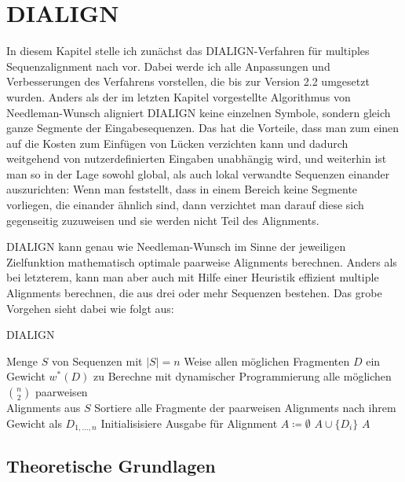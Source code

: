\chapter{DIALIGN}
\label{ch:DIALIGN}
In diesem Kapitel stelle ich zunächst das DIALIGN-Verfahren für multiples Sequenzalignment nach \cite{mdw96} vor. Dabei werde ich alle Anpassungen und Verbesserungen des Verfahrens vorstellen, die bis zur Version 2.2 umgesetzt wurden. Anders als der im letzten Kapitel vorgestellte Algorithmus von Needleman-Wunsch aligniert DIALIGN keine einzelnen Symbole, sondern gleich ganze Segmente der Eingabesequenzen. Das hat die Vorteile, dass man zum einen auf die Kosten zum Einfügen von Lücken verzichten kann und dadurch weitgehend von nutzerdefinierten Eingaben unabhängig wird, und weiterhin ist man so in der Lage sowohl global, als auch lokal verwandte Sequenzen einander auszurichten: Wenn man feststellt, dass in einem Bereich keine Segmente vorliegen, die einander ähnlich sind, dann verzichtet man darauf diese sich gegenseitig zuzuweisen und sie werden nicht Teil des Alignments. 

DIALIGN	kann genau wie Needleman-Wunsch im Sinne der jeweiligen Zielfunktion mathematisch optimale paarweise Alignments berechnen. Anders als bei letzterem, kann man aber auch mit Hilfe einer Heuristik effizient multiple Alignments berechnen, die aus drei oder mehr Sequenzen bestehen. Das grobe Vorgehen sieht dabei wie folgt aus:

\begin{algorithm}
	\caption{DIALIGN}
	\label{alg:dialign}
	\begin{algorithmic}[1]
		
		\REQUIRE Menge $S$ von Sequenzen mit $|S| = n$
		\STATE Weise allen möglichen Fragmenten $D$ ein Gewicht $w^*(D)$ zu
		\STATE Berechne mit dynamischer Programmierung alle möglichen ${n}\choose{2}$ paarweisen \\ Alignments aus $S$
		\STATE Sortiere alle Fragmente der paarweisen Alignments nach ihrem Gewicht als $D_{1, \dots, n}$
		\STATE Initialisisiere Ausgabe für Alignment $A \coloneqq \emptyset$
				\STATE $A \cup \{D_i\}$
			\ENDIF
		\ENDFOR
		\RETURN $A$
	\end{algorithmic}
\end{algorithm}

\section{Theoretische Grundlagen}

